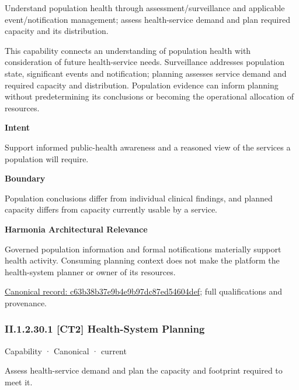 Understand population health through assessment/surveillance and applicable event/notification management; assess health-service demand and plan required capacity and its distribution.



This capability connects an understanding of population health with consideration of future health-service needs. Surveillance addresses population state, significant events and notification; planning assesses service demand and required capacity and distribution. Population evidence can inform planning without predetermining its conclusions or becoming the operational allocation of resources.



\textbf{Intent}



Support informed public-health awareness and a reasoned view of the services a population will require.



\textbf{Boundary}



Population conclusions differ from individual clinical findings, and planned capacity differs from capacity currently usable by a service.



\textbf{Harmonia Architectural Relevance}



Governed population information and formal notifications materially support health activity. Consuming planning context does not make the platform the health-system planner or owner of its resources.


{\footnotesize \href{../../../../continuum/strategy/capability/c63b38b37e9b4e9b97dc87ed54604def.md}{Canonical record: c63b38b37e9b4e9b97dc87ed54604def}; full qualifications and provenance.}\par
\subsubsection*{II.1.2.30.1 [CT2] Health-System Planning}
\label{navigation:II.1.2.30.1}

\label{element:9ca4df07eceb4150a0190cc488270ce2}
{\small Capability · Canonical · current}\par

Assess health-service demand and plan the capacity and footprint required to meet it.



